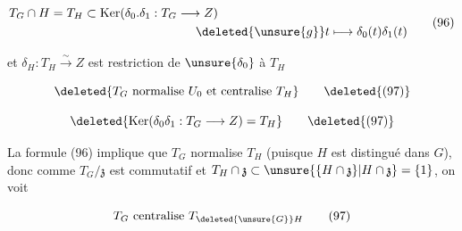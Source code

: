 \[\begin{aligned}
T_G\cap H=T_H&\subset\operatorname{Ker}(\delta_0.\delta_1:T_G\longrightarrow Z)\\
&\hspace{9em}\deleted{\unsure{g}}t\longmapsto\delta_0(t)\delta_1(t)
\end{aligned}\tag*{(96)}\]

et  $\delta_H:T_H\xrightarrow{\sim}Z$ est  restriction de $\unsure{\delta_0}$ à $T_H$


\[\deleted{T_G\ \text{normalise }U_0\text{ et centralise }T_H}\tag*{\deleted{(97)}}\]

\[\deleted{\operatorname{Ker}(\delta_0\delta_1:T_G\longrightarrow Z)=T_H}\tag*{\deleted{(97)}}\]


La formule (96) implique que $T_G$ normalise $T_H$ (puisque $H$ est distingué dans $G$), donc comme $T_G/\mathfrak{z}$ est commutatif et $T_H\cap\mathfrak{z}\subset\unsure{\{H\cap\mathfrak{z}\}|H\cap\mathfrak{z}}=\{1\}$, on voit

\[T_G\text{ centralise }T_{\deleted{\unsure{G}}H}\tag*{(97)}\]

